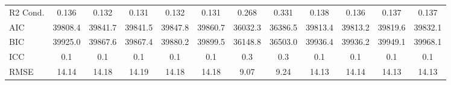 \documentclass[]{report}
\begin{document}
\begin{table}
{\begin{tabular}[t]{lccccccccccc}
		R2 Cond. & \num{0.136} & \num{0.132} & \num{0.131} & \num{0.132} & \num{0.131} & \num{0.268} & \num{0.331} & \num{0.138} & \num{0.136} & \num{0.137} & \num{0.137}\\
		AIC & \num{39808.4} & \num{39841.7} & \num{39841.5} & \num{39847.8} & \num{39860.7} & \num{36032.3} & \num{36386.5} & \num{39813.4} & \num{39813.2} & \num{39819.6} & \num{39832.1}\\
		BIC & \num{39925.0} & \num{39867.6} & \num{39867.4} & \num{39880.2} & \num{39899.5} & \num{36148.8} & \num{36503.0} & \num{39936.4} & \num{39936.2} & \num{39949.1} & \num{39968.1}\\
		ICC & \num{0.1} & \num{0.1} & \num{0.1} & \num{0.1} & \num{0.1} & \num{0.3} & \num{0.3} & \num{0.1} & \num{0.1} & \num{0.1} & \num{0.1}\\
		RMSE & \num{14.14} & \num{14.18} & \num{14.19} & \num{14.18} & \num{14.18} & \num{9.07} & \num{9.24} & \num{14.13} & \num{14.14} & \num{14.13} & \num{14.13}\\
		\bottomrule
	\end{tabular}}
\end{table}
\end{document}
